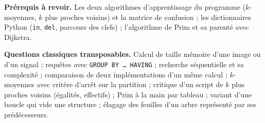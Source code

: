 \documentclass[11pt,a4paper]{article}
\begin{document}
\textbf{Prérequis à revoir.} Les deux algorithmes d'apprentissage du programme (\(k\)-moyennes, \(k\) plus proches voisins) et la matrice de confusion ; les dictionnaires Python (\texttt{in}, \texttt{del}, parcours des clefs) ; l'algorithme de Prim et sa parenté avec Dijkstra.

\textbf{Questions classiques transposables.} Calcul de taille mémoire d'une image ou d'un signal ; requêtes avec \texttt{GROUP\ BY\ …\ HAVING} ; recherche séquentielle et sa complexité ; comparaison de deux implémentations d'un même calcul ; \(k\)-moyennes avec critère d'arrêt sur la partition ; critique d'un script de \(k\) plus proches voisins (égalités, effectifs) ; Prim à la main par tableau ; variant d'une boucle qui vide une structure ; élagage des feuilles d'un arbre représenté par ses prédécesseurs.
\end{document}
